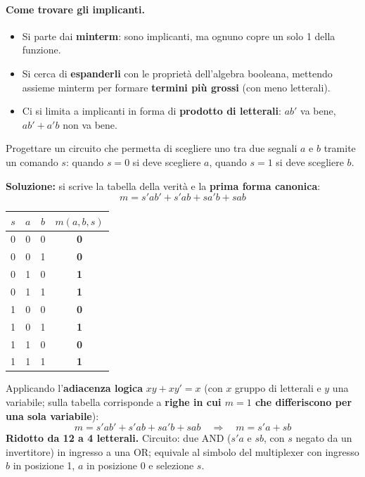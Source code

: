 \documentclass[12pt, a4paper]{article}
\begin{document}
\paragraph{Come trovare gli implicanti.}
\begin{itemize}
    \item Si parte dai \textbf{minterm}: sono implicanti, ma ognuno copre un solo 1 della funzione.
    \item Si cerca di \textbf{espanderli} con le proprietà dell'algebra booleana, mettendo assieme minterm per formare \textbf{termini più grossi} (con meno letterali).
    \item Ci si limita a implicanti in forma di \textbf{prodotto di letterali}: $ab'$ va bene, $ab' + a'b$ \textcolor{red!80!black}{non va bene}.
\end{itemize}

\begin{tcolorbox}[colback=lightergray!10, colframe=tocsec, title=\textbf{Esercizio: multiplexer 2 a 1}]
Progettare un circuito che permetta di scegliere uno tra due segnali $a$ e $b$ tramite un comando $s$: quando $s = 0$ si deve scegliere $a$, quando $s = 1$ si deve scegliere $b$.
\end{tcolorbox}

\textbf{Soluzione:} si scrive la tabella della verità e la \textbf{prima forma canonica}:
$$m = s'ab' + s'ab + sa'b + sab$$

\begin{center}
\renewcommand{\arraystretch}{1.25}
\begin{tabular}[t]{|ccc||c|}
\hline
\colorbox{gray!25}{\color{black}$s$} & \colorbox{gray!25}{\color{black}$a$} & \colorbox{gray!25}{\color{black}$b$} & \colorbox{gray!25}{\color{black}$m(a,b,s)$} \\ \hline
0 & 0 & 0 & \textbf{0} \\ \hline
0 & 0 & 1 & \textbf{0} \\ \hline
0 & 1 & 0 & \textbf{1} \\ \hline
0 & 1 & 1 & \textbf{1} \\ \hline
1 & 0 & 0 & \textbf{0} \\ \hline
1 & 0 & 1 & \textbf{1} \\ \hline
1 & 1 & 0 & \textbf{0} \\ \hline
1 & 1 & 1 & \textbf{1} \\ \hline
\end{tabular}
\end{center}

Applicando l'\textbf{adiacenza logica} $xy + xy' = x$ (con $x$ gruppo di letterali e $y$ una variabile; sulla tabella corrisponde a \textbf{righe in cui $m = 1$ che differiscono per una sola variabile}):
$$m = s'ab' + s'ab + sa'b + sab \quad\Rightarrow\quad m = s'a + sb$$
\textbf{Ridotto da 12 a 4 letterali.} Circuito: due AND ($s'a$ e $sb$, con $s$ negato da un invertitore) in ingresso a una OR; equivale al simbolo del multiplexer con ingresso $b$ in posizione 1, $a$ in posizione 0 e selezione $s$.
\end{document}
